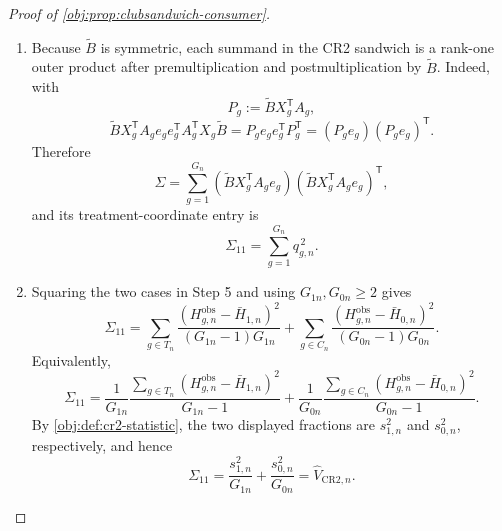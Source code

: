 \begin{proof}[Proof of \cref{obj:prop:clubsandwich-consumer}]
\begin{enumerate}
\item
Because \(\widetilde B\) is symmetric, each summand in the CR2 sandwich is a
rank-one outer product after premultiplication and postmultiplication by
\(\widetilde B\).  Indeed, with
\[
P_g:=\widetilde B X_g^{\mathsf T}A_g,
\]
\[
\widetilde B X_g^{\mathsf T}A_ge_ge_g^{\mathsf T}A_g^{\mathsf T}X_g\widetilde B
=
P_ge_ge_g^{\mathsf T}P_g^{\mathsf T}
=
(P_ge_g)(P_ge_g)^{\mathsf T}.
\]
Therefore
\[
\Sigma
=
\sum_{g=1}^{G_n}
\left(\widetilde B X_g^{\mathsf T}A_ge_g\right)
\left(\widetilde B X_g^{\mathsf T}A_ge_g\right)^{\mathsf T},
\]
and its treatment-coordinate entry is
\[
\Sigma_{11}
=
\sum_{g=1}^{G_n}q_{g,n}^{\,2}.
\]

\item
Squaring the two cases in Step 5 and using \(G_{1n},G_{0n}\ge2\) gives
\[
\Sigma_{11}
=
\sum_{g\in T_n}
\frac{(H_{g,n}^{\mathrm{obs}}-\bar H_{1,n})^2}{(G_{1n}-1)G_{1n}}
+
\sum_{g\in C_n}
\frac{(H_{g,n}^{\mathrm{obs}}-\bar H_{0,n})^2}{(G_{0n}-1)G_{0n}}.
\]
Equivalently,
\[
\Sigma_{11}
=
\frac{1}{G_{1n}}
\frac{\sum_{g\in T_n}(H_{g,n}^{\mathrm{obs}}-\bar H_{1,n})^2}{G_{1n}-1}
+
\frac{1}{G_{0n}}
\frac{\sum_{g\in C_n}(H_{g,n}^{\mathrm{obs}}-\bar H_{0,n})^2}{G_{0n}-1}.
\]
By \cref{obj:def:cr2-statistic}, the two displayed fractions are
\(s_{1,n}^2\) and \(s_{0,n}^2\), respectively, and hence
\[
\Sigma_{11}
=
\frac{s_{1,n}^2}{G_{1n}}
+
\frac{s_{0,n}^2}{G_{0n}}
=
\widehat V_{\mathrm{CR2},n}.
\]
\end{enumerate}
\end{proof}


